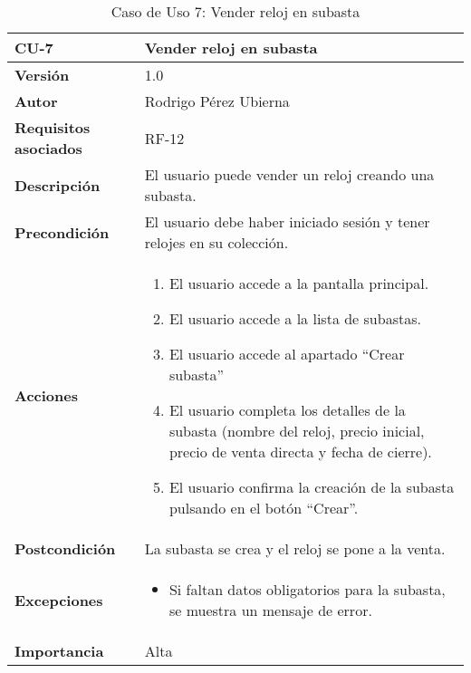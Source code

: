 \begin{table}[p]
	\centering
	\begin{tabularx}{\linewidth}{ p{} p{} }
		\toprule
		\textbf{CU-7} & \textbf{Vender reloj en subasta}\\
		\toprule
		\textbf{Versión} & 1.0 \\
		\textbf{Autor} & Rodrigo Pérez Ubierna \\
		\textbf{Requisitos asociados} & RF-12\\
		\textbf{Descripción} & El usuario puede vender un reloj creando una subasta. \\
		\textbf{Precondición} & El usuario debe haber iniciado sesión y tener relojes en su colección. \\
		\textbf{Acciones} &
		\begin{enumerate}
			\def\labelenumi{\arabic{enumi}.}
			\tightlist
			\item El usuario accede a la pantalla principal.
			\item El usuario accede a la lista de subastas.
			\item El usuario accede al apartado ``Crear subasta''
			\item El usuario completa los detalles de la subasta (nombre del reloj, precio inicial, precio de venta directa y fecha de cierre).
			\item El usuario confirma la creación de la subasta pulsando en el botón ``Crear''.
		\end{enumerate}\\
		\textbf{Postcondición} & La subasta se crea y el reloj se pone a la venta. \\
		\textbf{Excepciones} &
			\begin{itemize}
				\item Si faltan datos obligatorios para la subasta, se muestra un mensaje de error.
			\end{itemize} \\
		\textbf{Importancia} & Alta \\
		\bottomrule
	\end{tabularx}
	\caption{Caso de Uso 7: Vender reloj en subasta}
\end{table}

